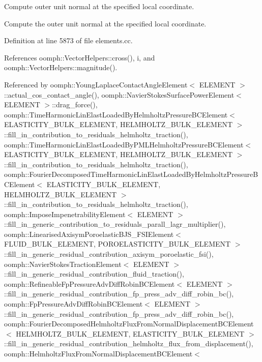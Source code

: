Compute outer unit normal at the specified local coordinate. 

Compute the outer unit normal at the specified local coordinate. 

Definition at line 5873 of file elements.\+cc.



References oomph\+::\+Vector\+Helpers\+::cross(), i, and oomph\+::\+Vector\+Helpers\+::magnitude().



Referenced by oomph\+::\+Young\+Laplace\+Contact\+Angle\+Element$<$ E\+L\+E\+M\+E\+N\+T $>$\+::actual\+\_\+cos\+\_\+contact\+\_\+angle(), oomph\+::\+Navier\+Stokes\+Surface\+Power\+Element$<$ E\+L\+E\+M\+E\+N\+T $>$\+::drag\+\_\+force(), oomph\+::\+Time\+Harmonic\+Lin\+Elast\+Loaded\+By\+Helmholtz\+Pressure\+B\+C\+Element$<$ E\+L\+A\+S\+T\+I\+C\+I\+T\+Y\+\_\+\+B\+U\+L\+K\+\_\+\+E\+L\+E\+M\+E\+N\+T, H\+E\+L\+M\+H\+O\+L\+T\+Z\+\_\+\+B\+U\+L\+K\+\_\+\+E\+L\+E\+M\+E\+N\+T $>$\+::fill\+\_\+in\+\_\+contribution\+\_\+to\+\_\+residuals\+\_\+helmholtz\+\_\+traction(), oomph\+::\+Time\+Harmonic\+Lin\+Elast\+Loaded\+By\+P\+M\+L\+Helmholtz\+Pressure\+B\+C\+Element$<$ E\+L\+A\+S\+T\+I\+C\+I\+T\+Y\+\_\+\+B\+U\+L\+K\+\_\+\+E\+L\+E\+M\+E\+N\+T, H\+E\+L\+M\+H\+O\+L\+T\+Z\+\_\+\+B\+U\+L\+K\+\_\+\+E\+L\+E\+M\+E\+N\+T $>$\+::fill\+\_\+in\+\_\+contribution\+\_\+to\+\_\+residuals\+\_\+helmholtz\+\_\+traction(), oomph\+::\+Fourier\+Decomposed\+Time\+Harmonic\+Lin\+Elast\+Loaded\+By\+Helmholtz\+Pressure\+B\+C\+Element$<$ E\+L\+A\+S\+T\+I\+C\+I\+T\+Y\+\_\+\+B\+U\+L\+K\+\_\+\+E\+L\+E\+M\+E\+N\+T, H\+E\+L\+M\+H\+O\+L\+T\+Z\+\_\+\+B\+U\+L\+K\+\_\+\+E\+L\+E\+M\+E\+N\+T $>$\+::fill\+\_\+in\+\_\+contribution\+\_\+to\+\_\+residuals\+\_\+helmholtz\+\_\+traction(), oomph\+::\+Impose\+Impenetrability\+Element$<$ E\+L\+E\+M\+E\+N\+T $>$\+::fill\+\_\+in\+\_\+generic\+\_\+contribution\+\_\+to\+\_\+residuals\+\_\+parall\+\_\+lagr\+\_\+multiplier(), oomph\+::\+Linearised\+Axisym\+Poroelastic\+B\+J\+S\+\_\+\+F\+S\+I\+Element$<$ F\+L\+U\+I\+D\+\_\+\+B\+U\+L\+K\+\_\+\+E\+L\+E\+M\+E\+N\+T, P\+O\+R\+O\+E\+L\+A\+S\+T\+I\+C\+I\+T\+Y\+\_\+\+B\+U\+L\+K\+\_\+\+E\+L\+E\+M\+E\+N\+T $>$\+::fill\+\_\+in\+\_\+generic\+\_\+residual\+\_\+contribution\+\_\+axisym\+\_\+poroelastic\+\_\+fsi(), oomph\+::\+Navier\+Stokes\+Traction\+Element$<$ E\+L\+E\+M\+E\+N\+T $>$\+::fill\+\_\+in\+\_\+generic\+\_\+residual\+\_\+contribution\+\_\+fluid\+\_\+traction(), oomph\+::\+Refineable\+Fp\+Pressure\+Adv\+Diff\+Robin\+B\+C\+Element$<$ E\+L\+E\+M\+E\+N\+T $>$\+::fill\+\_\+in\+\_\+generic\+\_\+residual\+\_\+contribution\+\_\+fp\+\_\+press\+\_\+adv\+\_\+diff\+\_\+robin\+\_\+bc(), oomph\+::\+Fp\+Pressure\+Adv\+Diff\+Robin\+B\+C\+Element$<$ E\+L\+E\+M\+E\+N\+T $>$\+::fill\+\_\+in\+\_\+generic\+\_\+residual\+\_\+contribution\+\_\+fp\+\_\+press\+\_\+adv\+\_\+diff\+\_\+robin\+\_\+bc(), oomph\+::\+Fourier\+Decomposed\+Helmholtz\+Flux\+From\+Normal\+Displacement\+B\+C\+Element$<$ H\+E\+L\+M\+H\+O\+L\+T\+Z\+\_\+\+B\+U\+L\+K\+\_\+\+E\+L\+E\+M\+E\+N\+T, E\+L\+A\+S\+T\+I\+C\+I\+T\+Y\+\_\+\+B\+U\+L\+K\+\_\+\+E\+L\+E\+M\+E\+N\+T $>$\+::fill\+\_\+in\+\_\+generic\+\_\+residual\+\_\+contribution\+\_\+helmholtz\+\_\+flux\+\_\+from\+\_\+displacement(), oomph\+::\+Helmholtz\+Flux\+From\+Normal\+Displacement\+B\+C\+Element$<$ 